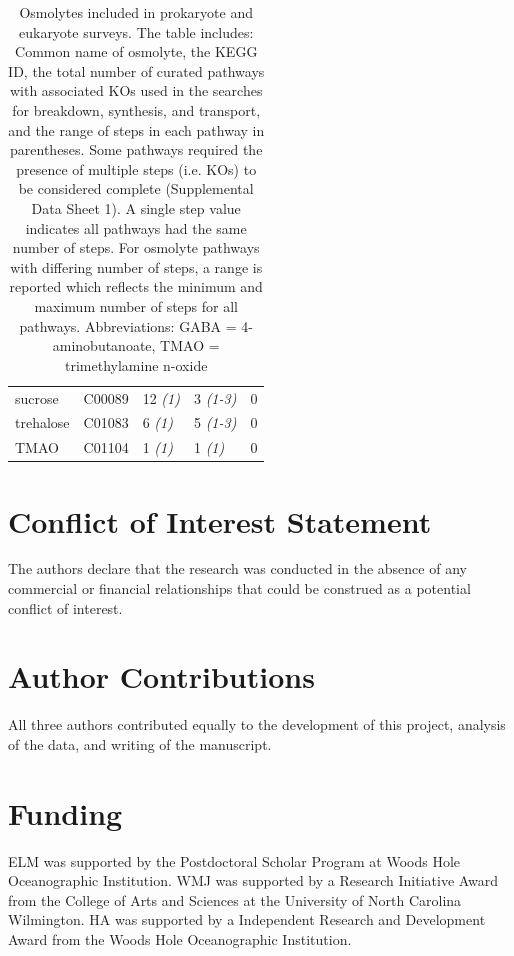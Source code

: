 \documentclass[utf8]{frontiersSCNS} %
\begin{document}
\begin{table}
\begin{tabular}{lllll}
sucrose              & C00089           & 12 \emph{(1)}                                 & 3 \emph{(1-3)}                                & 0                                      \\
trehalose            & C01083           & 6 \emph{(1)}                                  & 5 \emph{(1-3)}                                & 0                                      \\
TMAO                 & C01104           & 1 \emph{(1)}                                  & 1 \emph{(1)}                                  & 0                                     
\end{tabular}
\caption{Osmolytes included in prokaryote and eukaryote surveys. The table includes: Common name of osmolyte, the KEGG ID, the total number of curated pathways with associated KOs used in the searches for breakdown, synthesis, and transport, and the range of steps in each pathway in parentheses. Some pathways required the presence of multiple steps (i.e. KOs) to be considered complete (Supplemental Data Sheet 1). A single step value indicates all pathways had the same number of steps. For osmolyte pathways with differing number of steps, a range is reported which reflects the minimum and maximum number of steps for all pathways. Abbreviations: GABA = 4-aminobutanoate, TMAO =  trimethylamine n-oxide}
\label{tabl:pathnum}
\end{table}
\egroup


\section*{Conflict of Interest Statement}

The authors declare that the research was conducted in the absence of any commercial or financial relationships that could be construed as a potential conflict of interest.

\section*{Author Contributions}
All three authors contributed equally to the development of this project, analysis of the data, and writing of the manuscript.

\section*{Funding}
ELM was supported by the Postdoctoral Scholar Program at Woods Hole Oceanographic Institution. WMJ was supported by a Research Initiative Award from the College of Arts and Sciences at the University of North Carolina Wilmington. HA was supported by a Independent Research and Development Award from the Woods Hole Oceanographic Institution. 
\end{document}
